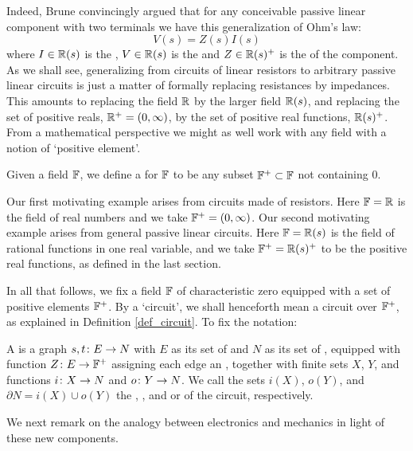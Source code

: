 Indeed, Brune convincingly argued that for any conceivable passive linear
component with two terminals we have this generalization of Ohm's law:
\[
  V(s)=Z(s)I(s)
\]
where $I \in {\mathbb{R}}(s)$ is the , $V \in {\mathbb{R}}(s)$ is the 
and $Z \in {\mathbb{R}}(s)^+$ is the  of the component.   As we shall
see, generalizing from circuits of linear resistors to arbitrary passive linear
circuits is just a matter of formally replacing resistances by  impedances.
This amounts to replacing the field ${\mathbb{R}}$ by the larger field ${\mathbb{R}}(s)$, and
replacing the set of positive reals, ${\mathbb{R}}^+ = (0,\infty)$, by the set of positive
real functions, ${\mathbb{R}}(s)^+$.  From a mathematical perspective we might as well
work with any field with a notion of `positive element'. 

\begin{definition} 
  Given a field ${\mathbb F}$, we define a  for ${\mathbb F}$ to be  
  any subset ${\mathbb F}^+\subset {\mathbb F}$ not containing $0$.
\end{definition}

Our first motivating example arises from circuits made of resistors.  Here ${\mathbb F} =
{\mathbb{R}}$ is the field of real numbers and we take ${\mathbb F}^+ = (0,\infty)$.   Our second
motivating example arises from general passive linear circuits.  Here ${\mathbb F} =
{\mathbb{R}}(s)$ is the field of rational functions in one real variable, and we take
${\mathbb F}^+ = {\mathbb{R}}(s)^+$ to be the positive real functions, as defined in the last
section.  

In all that follows, we fix a field ${\mathbb F}$ of characteristic zero equipped with a
set of positive elements ${\mathbb F}^+$.  By a `circuit', we shall henceforth mean a
circuit over ${\mathbb F}^+$, as explained in Definition \ref{def_circuit}.   To fix the
notation:

\begin{definition} \label{def_circuit_2}
A  is a graph $s,t {\colon} E \to N$ with $E$ as its set of  and $N$ as its set of , equipped with function $Z {\colon} E \to {\mathbb F}^+$ assigning each edge an , together with finite sets $X$, $Y$, and functions $i {\colon} X \to N$ and $o{\colon} Y \to  N$. We call the sets $i(X)$, $o(Y)$, and $\partial N = i(X) \cup o(Y)$ the , , and  or  of the circuit, respectively.
\end{definition}

We next remark on the analogy between electronics and mechanics in light of
these new components.

